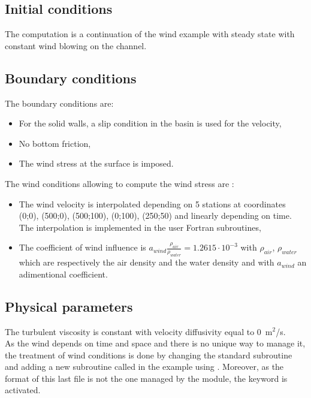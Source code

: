 \subsection{Initial conditions}

The computation is a continuation of the wind example with steady state with constant wind
blowing on the channel.

\subsection{Boundary conditions}

The boundary conditions are:
\begin{itemize}
\item For the solid walls, a slip condition in the basin is used for the velocity,
\item No bottom friction,
\item The wind stress at the surface is imposed.
\end{itemize}
The wind conditions allowing to compute the wind stress are :
\begin{itemize}
\item The wind velocity is interpolated depending on 5 stations at coordinates (0;0), (500;0), (500;100), (0;100), (250;50) and linearly depending on time. The interpolation is implemented in the user Fortran subroutines,
\item The coefficient of wind influence is
 $a_{wind} \frac{\rho_{air}}{\rho_{water}} = 1.2615 \cdot 10^{-3}$ 
 with $\rho_{air}$, $\rho_{water}$ which are respectively the air density 
 and the water density and with $a_{wind}$ an adimentional coefficient.
\end{itemize}

\subsection{Physical parameters}

The turbulent viscosity is constant with velocity 
diffusivity equal to 0~m$^2$/s.
\\

As the wind depends on time and space and there is no unique way to manage it,
the treatment of wind conditions is done by changing the standard 
subroutine and adding a new subroutine called 
in the example using .
Moreover, as the format of this last file is not the one managed by the
 module, the keyword
 is activated.\\

